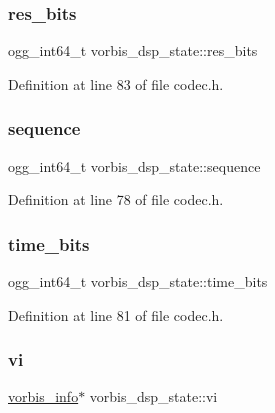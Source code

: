 \subsubsection{\texorpdfstring{res\_bits}{res\_bits}}
{\footnotesize\ttfamily ogg\+\_\+int64\+\_\+t vorbis\+\_\+dsp\+\_\+state\+::res\+\_\+bits}



Definition at line 83 of file codec.\+h.

\mbox{\label{structvorbis__dsp__state_a38a8b96daf9d16d8cce0522e203635a6}} 
\subsubsection{\texorpdfstring{sequence}{sequence}}
{\footnotesize\ttfamily ogg\+\_\+int64\+\_\+t vorbis\+\_\+dsp\+\_\+state\+::sequence}



Definition at line 78 of file codec.\+h.

\mbox{\label{structvorbis__dsp__state_adef49c2187f4ed3381973274e1b01151}} 
\subsubsection{\texorpdfstring{time\_bits}{time\_bits}}
{\footnotesize\ttfamily ogg\+\_\+int64\+\_\+t vorbis\+\_\+dsp\+\_\+state\+::time\+\_\+bits}



Definition at line 81 of file codec.\+h.

\mbox{\label{structvorbis__dsp__state_ab6819a31e79031cdcd8f2ff40a5c1def}} 
\subsubsection{\texorpdfstring{vi}{vi}}
{\footnotesize\ttfamily \mbox{\hyperlink{structvorbis__info}{vorbis\+\_\+info}}$\ast$ vorbis\+\_\+dsp\+\_\+state\+::vi}



